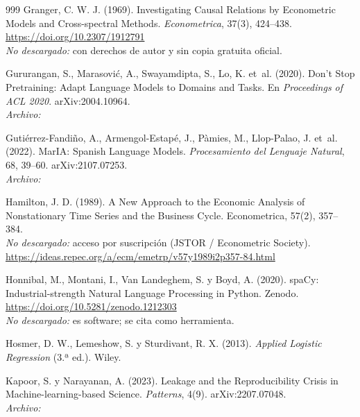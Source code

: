 \begin{thebibliography}{999}
Granger, C. W. J. (1969). Investigating Causal Relations by Econometric Models and Cross-spectral Methods. \emph{Econometrica}, 37(3), 424--438. \url{https://doi.org/10.2307/1912791}
\\\textit{No descargado:} con derechos de autor y sin copia gratuita oficial.

Gururangan, S., Marasovi{\'c}, A., Swayamdipta, S., Lo, K. et~al. (2020). Don't Stop Pretraining: Adapt Language Models to Domains and Tasks. En \emph{Proceedings of ACL 2020}. arXiv:2004.10964.
\\\textit{Archivo:} 

Guti{\'e}rrez-Fandi{\~n}o, A., Armengol-Estap{\'e}, J., P{\`a}mies, M., Llop-Palao, J. et~al. (2022). {MarIA}: Spanish Language Models. \emph{Procesamiento del Lenguaje Natural}, 68, 39--60. arXiv:2107.07253.
\\\textit{Archivo:} 

Hamilton, J. D. (1989). A New Approach to the Economic Analysis of Nonstationary Time Series and the Business Cycle. Econometrica, 57(2), 357–384.
\\\textit{No descargado:} acceso por suscripción (JSTOR / Econometric Society). \url{https://ideas.repec.org/a/ecm/emetrp/v57y1989i2p357-84.html}

Honnibal, M., Montani, I., Van Landeghem, S. y Boyd, A. (2020). {spaCy}: Industrial-strength Natural Language Processing in Python. Zenodo. \url{https://doi.org/10.5281/zenodo.1212303}
\\\textit{No descargado:} es software; se cita como herramienta.

Hosmer, D. W., Lemeshow, S. y Sturdivant, R. X. (2013). \textit{Applied Logistic Regression} (3.ª ed.). Wiley.

Kapoor, S. y Narayanan, A. (2023). Leakage and the Reproducibility Crisis in Machine-learning-based Science. \emph{Patterns}, 4(9). arXiv:2207.07048.
\\\textit{Archivo:} 


\end{thebibliography}
